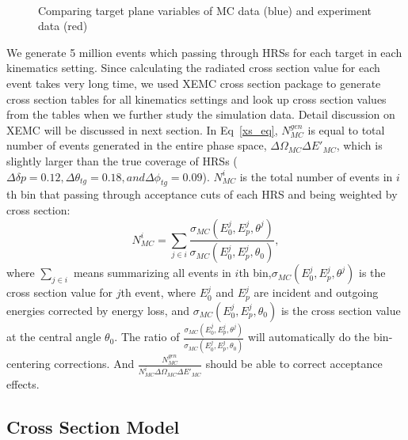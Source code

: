 \documentclass[a4paper,18.pt]{article}
\begin{document}
\begin{figure}[ht!]
 \begin{center}
\\
 \caption[Comparing MC data and experiment data]{Comparing target plane variables of MC data (blue) and experiment data (red)}
 \label{samc_tg}
\end{center}
\end{figure}


We generate 5 million events which passing through HRSs for each target in each kinematics setting. Since calculating the radiated cross section value for each event takes very long time, we used XEMC cross section package to generate cross section tables for all kinematics settings and look up cross section values from the tables when we further study the simulation data. Detail discussion on XEMC will be discussed in next section. In Eq~\eqref{xs_eq}, $N_{MC}^{gen}$ is equal to total number of events generated in the entire phase space, $\Delta\Omega_{MC}\Delta E'_{MC}$, which is slightly larger than the true coverage of HRSs ($\Delta\delta p=0.12, \Delta\theta_{tg}=0.18, and \Delta\phi_{tg}=0.09$). $N_{MC}^{i}$ is the total number of events in $i$th bin that passing through acceptance cuts of each HRS and being weighted by cross section:
\begin{equation}
  N_{MC}^{i} = \sum_{j\in i} \frac{\sigma_{MC}(E_{0}^{j},E_{p}^{j},\theta^{j})}{\sigma_{MC}(E_{0}^{j},E_{p}^{j},\theta_{0})},
\end{equation}
where $\sum_{j\in i}$ means summarizing all events in $i$th bin,$\sigma_{MC}(E_{0}^{j},E_{p}^{j},\theta^{j})$ is the cross section value for $j$th event, where $E_{0}^{j}$ and $E_{p}^{j}$ are incident and outgoing energies corrected by energy loss, and $\sigma_{MC}(E_{0}^{j},E_{p}^{j},\theta_{0})$ is the cross section value at the central angle $\theta_{0}$. The ratio of $\frac{\sigma_{MC}(E_{0}^{j},E_{p}^{j},\theta^{j})}{\sigma_{MC}(E_{0}^{j},E_{p}^{j},\theta_{0})}$ will automatically do the bin-centering corrections. And $\frac{N_{MC}^{gen}}{N_{MC}^{i} \Delta\Omega_{MC} \Delta E'_{MC}}$ should be able to correct acceptance effects.


\subsection{Cross Section Model}
\end{document}
